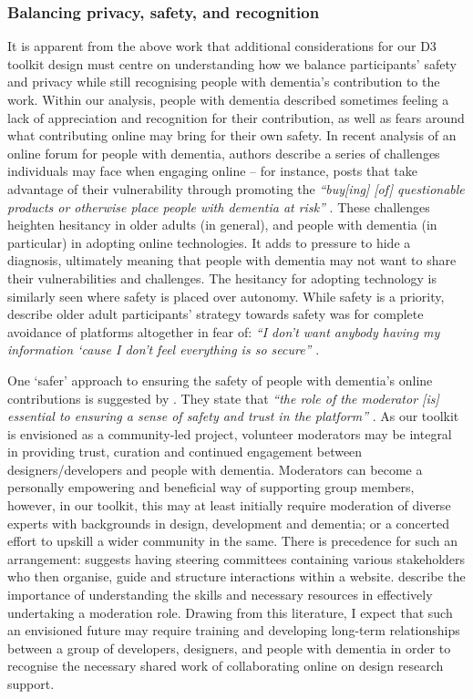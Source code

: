 \subsubsection{Balancing privacy, safety, and recognition}
It is apparent from the above work that additional considerations for our D3 toolkit design must centre on understanding how we balance participants’ safety and privacy while still recognising people with dementia's contribution to the work. Within our analysis, people with dementia described sometimes feeling a lack of appreciation and recognition for their contribution, as well as fears around what contributing online may bring for their own safety. In \cite{johnson2020roles} recent analysis of an online forum for people with dementia, authors describe a series of challenges individuals may face when engaging online – for instance, posts that take advantage of their vulnerability through promoting the \textit{``buy[ing] [of] questionable products or otherwise place people with dementia at risk''} \citep[pg.127]{johnson2020roles}. These challenges heighten hesitancy in older adults (in general), and people with dementia (in particular) in adopting online technologies. It adds to pressure to hide a diagnosis, ultimately meaning that people with dementia may not want to share their vulnerabilities and challenges. The hesitancy for adopting technology is similarly seen where safety is placed over autonomy. While safety is a priority, \cite{quan2020online} describe older adult participants’ strategy towards safety was for complete avoidance of platforms altogether in fear of: \textit{``I don’t want anybody having my information ‘cause I don’t feel everything is so secure'' } \citep[pg.1095]{quan2020online}.

One ‘safer’ approach to ensuring the safety of people with dementia’s online contributions is suggested by \cite{lazar_safe_2019}. They state that \textit{``the role of the moderator [is] essential to ensuring a sense of safety and trust in the platform''  }\citep[pg.85:9]{lazar_safe_2019}. As our toolkit is envisioned as a community-led project, volunteer moderators may be integral in providing trust, curation and continued engagement between designers/developers and people with dementia. Moderators can become a personally empowering and beneficial way of supporting group members, however, in our toolkit, this may at least initially require moderation of diverse experts with backgrounds in design, development and dementia; or a concerted effort to upskill a wider community in the same. There is precedence for such an arrangement: \cite{kendall2008collaborative} suggests having steering committees containing various stakeholders who then organise, guide and structure interactions within a website. \cite{coulson2013nurturing} describe the importance of understanding the skills and necessary resources in effectively undertaking a moderation role. Drawing from this literature, I expect that such an envisioned future may require training and developing long-term relationships between a group of developers, designers, and people with dementia in order to recognise the necessary shared work of collaborating online on design research support.

